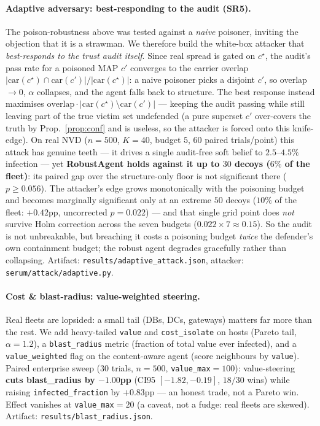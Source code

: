 \documentclass[11pt]{article}
\newcommand{\carriers}{\mathrm{car}}
\begin{document}
\paragraph{Adaptive adversary: best-responding to the audit (SR5).}
The poison-robustness above was tested against a \emph{naive} poisoner, inviting
the objection that it is a strawman. We therefore build the white-box attacker
that \emph{best-responds to the trust audit itself}. Since real spread is gated
on $c^\star$, the audit's pass rate for a poisoned MAP $c'$ converges to the
carrier overlap $|\carriers(c^\star)\cap\carriers(c')|/|\carriers(c^\star)|$: a
naive poisoner picks a disjoint $c'$, so overlap $\to 0$, $\alpha$ collapses, and
the agent falls back to structure. The best response instead maximises
$\text{overlap}\cdot|\carriers(c^\star)\setminus\carriers(c')|$ --- keeping the
audit passing while still leaving part of the true victim set undefended (a pure
superset $c'$ over-covers the truth by Prop.~\ref{prop:conf} and is useless, so
the attacker is forced onto this knife-edge). On real NVD ($n{=}500$, $K{=}40$,
budget $5$, 60 paired trials/point) this attack has genuine teeth --- it drives a
single audit-free soft belief to $2.5$--$4.5\%$ infection --- yet
\textbf{RobustAgent holds against it up to $30$ decoys ($6\%$ of the fleet)}: its
paired gap over the structure-only floor is not significant there
($p\!\geq\!0.056$). The attacker's edge grows monotonically with the poisoning
budget and becomes marginally significant only at an extreme $50$ decoys ($10\%$
of the fleet: $+0.42$pp, uncorrected $p=0.022$) --- and that single grid point
does \emph{not} survive Holm correction across the seven budgets
($0.022\times7\approx0.15$). So the audit is not unbreakable, but breaching it
costs a poisoning budget \emph{twice} the defender's own containment budget; the
robust agent degrades gracefully rather than collapsing. Artifact:
\texttt{results/adaptive\_attack.json}, attacker: \texttt{serum/attack/adaptive.py}.

\paragraph{Cost \& blast-radius: value-weighted steering.}
Real fleets are lopsided: a small tail (DBs, DCs, gateways) matters far more
than the rest. We add heavy-tailed \texttt{value} and \texttt{cost\_isolate} on
hosts (Pareto tail, $\alpha{=}1.2$), a \texttt{blast\_radius} metric (fraction
of total value ever infected), and a \texttt{value\_weighted} flag on the
content-aware agent (score neighbours by \texttt{value}). Paired enterprise
sweep (30 trials, $n{=}500$, \texttt{value\_max}$=100$): value-steering
\textbf{cuts blast\_radius by $-1.00$pp} (CI95 $[-1.82,-0.19]$, $18/30$ wins)
while raising \texttt{infected\_fraction} by $+0.83$pp --- an honest trade, not
a Pareto win. Effect vanishes at \texttt{value\_max}$=20$ (a caveat, not a
fudge: real fleets are skewed). Artifact:
\texttt{results/blast\_radius.json}.
\end{document}
